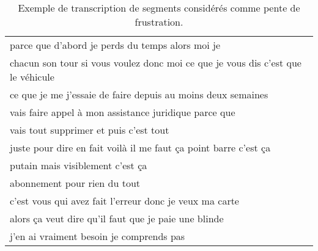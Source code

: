 \begin{table}[h]
    \centering
    \begin{tabular}{|l|}
         \hline
         parce que d'abord je perds du temps alors moi je \\
         chacun son tour si vous voulez donc moi ce que je vous dis c'est que le véhicule \\
        ce que je me j'essaie de faire depuis au moins deux semaines \\
        vais faire appel à mon assistance juridique parce que \\
        vais tout supprimer et puis c'est tout \\
        juste pour dire en fait voilà il me faut ça point barre c'est ça \\
        putain mais visiblement c'est ça \\
        abonnement pour rien du tout \\
        c'est vous qui avez fait l'erreur donc je veux ma carte \\
        alors ça veut dire qu'il faut que je paie une blinde \\
        j'en ai vraiment besoin je comprends pas \\
         \hline
    \end{tabular}
    \caption{Exemple de transcription de segments considérés comme pente de frustration.}
    \label{tab:phrasesPente}
\end{table}
